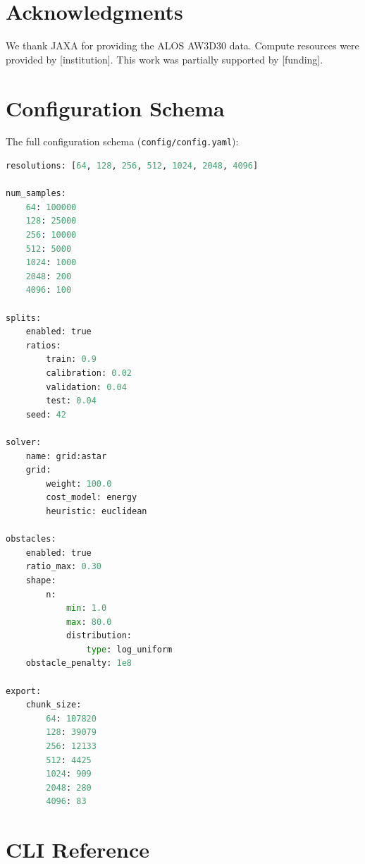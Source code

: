 \documentclass{article}
\begin{document}
\section*{Acknowledgments}

We thank JAXA for providing the ALOS AW3D30 data. Compute resources were provided by [institution]. This work was partially supported by [funding].



\appendix

\section{Configuration Schema}
\label{app:config}

The full configuration schema (\texttt{config/config.yaml}):

\begin{lstlisting}[language=Python,caption={Configuration schema excerpt}]
resolutions: [64, 128, 256, 512, 1024, 2048, 4096]

num_samples:
    64: 100000
    128: 25000
    256: 10000
    512: 5000
    1024: 1000
    2048: 200
    4096: 100

splits:
    enabled: true
    ratios:
        train: 0.9
        calibration: 0.02
        validation: 0.04
        test: 0.04
    seed: 42

solver:
    name: grid:astar
    grid:
        weight: 100.0
        cost_model: energy
        heuristic: euclidean

obstacles:
    enabled: true
    ratio_max: 0.30
    shape:
        n:
            min: 1.0
            max: 80.0
            distribution:
                type: log_uniform
    obstacle_penalty: 1e8

export:
    chunk_size:
        64: 107820
        128: 39079
        256: 12133
        512: 4425
        1024: 909
        2048: 280
        4096: 83
\end{lstlisting}

\section{CLI Reference}
\label{app:cli}
\end{document}
